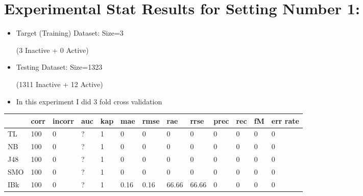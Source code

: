 \documentclass[a4paper,12pt, english]{article}
\begin{document}

\section{Experimental Stat Results for Setting Number 1:}
\begin{itemize}
\item Target (Training) Dataset: Size=3 \begin{scriptsize}(3 Inactive + 0 Active)\end{scriptsize}
\item Testing Dataset: Size=1323 \begin{scriptsize}(1311 Inactive + 12 Active)\end{scriptsize}
\item In this experiment I did 3 fold cross validation
\end{itemize}  

\begin{small}
\begin{center}
    \begin{tabular}{ | l | l | l | l | l | l | l | l | l | l | l | l | l |}
    \hline
      	& corr & incorr  & auc & kap & mae & rmse & rae & rrse & prec & rec & fM & err rate\\ \hline
      	TL & 100 & 0 & ? & 1 & 0 & 0 & 0 & 0 & 0 & 0 & 0 & 0\\ \hline
	NB & 100 & 0 & ? & 1 & 0 & 0 & 0 & 0 & 0 & 0 & 0 & 0\\ \hline
	J48 & 100 & 0 & ? & 1 & 0 & 0 & 0 & 0 & 0 & 0 & 0 & 0\\ \hline
	SMO & 100 & 0 & ? & 1 & 0 & 0 & 0 & 0 & 0 & 0 & 0 & 0\\ \hline
	IBk & 100 & 0 & ? & 1 & 0.16 & 0.16 & 66.66 & 66.66 & 0 & 0 & 0 & 0\\ \hline  
    \end{tabular}       
\end{center}
\end{small}
\end{document}
